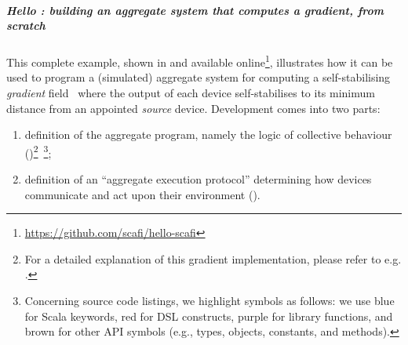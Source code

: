
\label{sec:examples}
\subparagraph{Hello \scafi{}: building an aggregate system that computes a gradient, from scratch}
This complete example, shown in  and available online\footnote{\url{https://github.com/scafi/hello-scafi}}, illustrates how it \scafi{} can be used
 to program a (simulated) aggregate system
 for computing a self-stabilising \emph{gradient} field~\cite{DBLP:conf/sac/BealBVT08,DBLP:journals/tomacs/ViroliABDP18}
 where the output of each device self-stabilises to
 its minimum distance from an appointed \emph{source} device.
%
Development comes into two parts:
\begin{enumerate}
  \item definition of the aggregate program,
  namely the logic of collective behaviour ()\footnote{For a detailed explanation of this gradient implementation, please refer to e.g. \cite{DBLP:journals/eaai/CasadeiVAPD21}.}~\footnote{Concerning source code listings, we highlight symbols as follows: we use blue for Scala keywords, red for \scafi{} DSL constructs, purple for \scafi{} library functions, and brown for other \scafi{} API symbols (e.g., types, objects, constants, and methods).};
  \item definition of an ``aggregate execution protocol''
  determining how devices communicate and act upon their environment ().
\end{enumerate}

